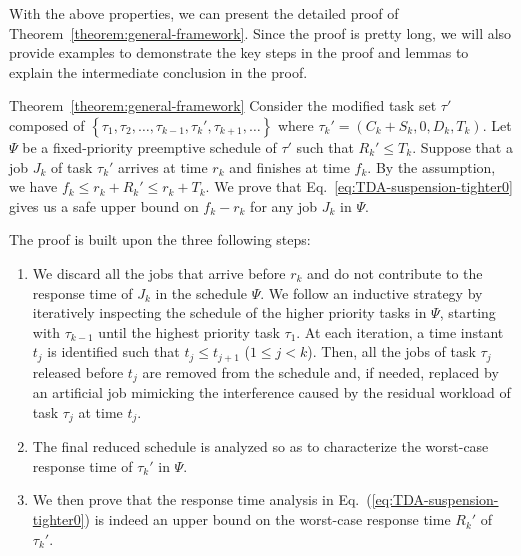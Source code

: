 With the above properties, we can present the detailed proof of
Theorem~\ref{theorem:general-framework}. Since the proof is pretty long, we 
will also provide examples to demonstrate the key steps in the proof and lemmas to explain the intermediate conclusion in the proof.

\begin{appProof}{Theorem~\ref{theorem:general-framework}}
Consider the modified task set $\tau'$ composed of $\left\{\tau_1, \tau_2, \ldots, \tau_{k-1}, \tau_k', \tau_{k+1}, \ldots \right\}$ where $\tau_k' = (C_k + S_k, 0, D_k, T_k)$. Let $\Psi$ be a fixed-priority preemptive schedule of $\tau'$ such that $R_k' \leq T_k$.  
Suppose that a job $J_{k}$ of task $\tau_k'$ arrives at time $r_k$ and finishes at time $f_k$. 
By the assumption, we have $f_k \leq r_k+R_k' \leq r_k+T_k$.
We prove that Eq.~\eqref{eq:TDA-suspension-tighter0} gives us a safe upper bound on $f_k-r_k$ for any job $J_k$ in $\Psi$.


The proof is built upon the three following steps:
\begin{enumerate}
\item We discard all the jobs that arrive before $r_k$ and do not contribute to the response time of $J_k$ in the schedule $\Psi$. We follow an inductive strategy by iteratively inspecting the schedule of the higher priority tasks in $\Psi$, starting with $\tau_{k-1}$ until the highest priority task $\tau_1$. At each iteration, a time instant $t_j$ is identified such that $t_j \leq t_{j+1}$ ($1 \leq j < k$). Then, all the jobs of task $\tau_j$ released before $t_j$ are removed from the schedule and, if needed, replaced by an artificial job mimicking the interference caused by the residual workload of task $\tau_j$ at time $t_j$. %
\item The final reduced schedule is analyzed so as to characterize the
  worst-case response time of $\tau_k'$ in $\Psi$. %
\item We then prove that the response time analysis in Eq.~(\ref{eq:TDA-suspension-tighter0}) is indeed an upper bound on the worst-case response time $R_k'$ of $\tau_k'$.
\end{enumerate}

  

\end{appProof}
